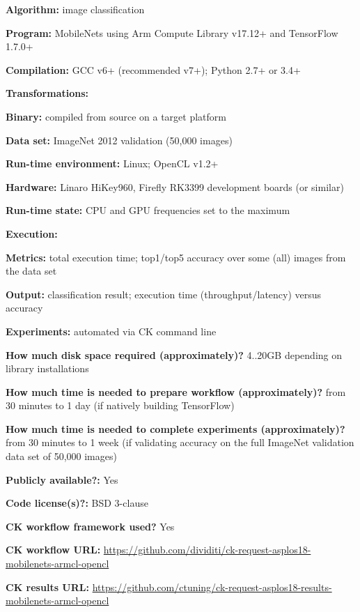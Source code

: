 \begin{packed_itemize}
  \item {\bf Algorithm:} image classification
  \item {\bf Program:} MobileNets using Arm Compute Library v17.12+ and TensorFlow 1.7.0+
  \item {\bf Compilation:} GCC v6+ (recommended v7+); Python 2.7+ or 3.4+
  \item {\bf Transformations:}
  \item {\bf Binary:} compiled from source on a target platform
  \item {\bf Data set:} ImageNet 2012 validation (50,000 images)
  \item {\bf Run-time environment:} Linux; OpenCL v1.2+
  \item {\bf Hardware:} Linaro HiKey960, Firefly RK3399 development boards (or similar)
  \item {\bf Run-time state:} CPU and GPU frequencies set to the maximum
  \item {\bf Execution:} 
  \item {\bf Metrics:} total execution time; top1/top5 accuracy over some (all) images from the data set
  \item {\bf Output:} classification result; execution time (throughput/latency) versus accuracy
  \item {\bf Experiments:} automated via CK command line
  \item {\bf How much disk space required (approximately)?} 4..20GB depending on library installations
  \item {\bf How much time is needed to prepare workflow (approximately)?} from 30 minutes to 1 day (if natively building TensorFlow)
  \item {\bf How much time is needed to complete experiments (approximately)?} from 30 minutes to 1 week (if validating accuracy on the full ImageNet validation data set of 50,000 images)
  \item {\bf Publicly available?:} Yes
  \item {\bf Code license(s)?:} BSD 3-clause
  \item {\bf CK workflow framework used?} Yes
  \item {\bf CK workflow URL:} \url{https://github.com/dividiti/ck-request-asplos18-mobilenets-armcl-opencl}
  \item {\bf CK results URL:} \url{https://github.com/ctuning/ck-request-asplos18-results-mobilenets-armcl-opencl}
\end{packed_itemize}

